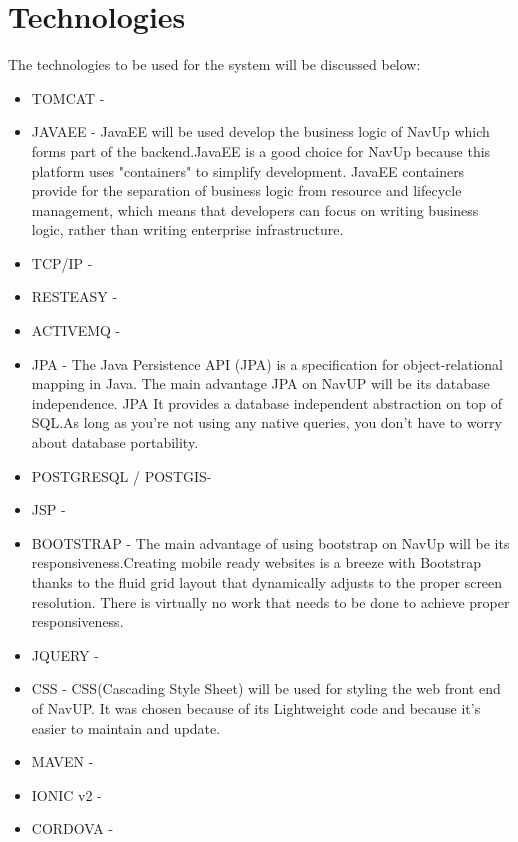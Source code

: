 
\section{Technologies}
The technologies to be used for the system will be discussed below:
\begin{itemize}
	\item TOMCAT - 
	
	\item JAVAEE - JavaEE will be used develop the business logic of NavUp which forms part of the backend.JavaEE is a good choice for NavUp because this platform uses "containers" to simplify development. JavaEE containers provide for the separation of business logic from resource and lifecycle management, which means that developers can focus on writing business logic, rather than writing enterprise infrastructure. 
	
	\item TCP/IP - 
	
	\item RESTEASY - 
	
	\item ACTIVEMQ - 
	
	\item JPA - The Java Persistence API (JPA) is a specification for object-relational mapping in Java. The main advantage JPA on NavUP will be its database independence. JPA It provides a database independent abstraction on top of SQL.As long as you’re not using any native queries, you don’t have to worry about database portability. 
	
	\item POSTGRESQL / POSTGIS- 
	
	
	
	\item JSP - 
	
	\item BOOTSTRAP - The main advantage of using bootstrap on NavUp will be its responsiveness.Creating mobile ready websites is a breeze with Bootstrap thanks to the fluid grid layout that dynamically adjusts to the proper screen resolution. There is virtually no work that needs to be done to achieve proper responsiveness.
	
	\item JQUERY - 
	
	\item CSS - CSS(Cascading Style Sheet) will be used for styling the web front end of NavUP. It was chosen because of its Lightweight code and because it's easier to maintain and update. 
	
	\item MAVEN - 
	
	
	
	\item IONIC v2 - 
	
	\item CORDOVA - 
	
	
	
\end{itemize}
